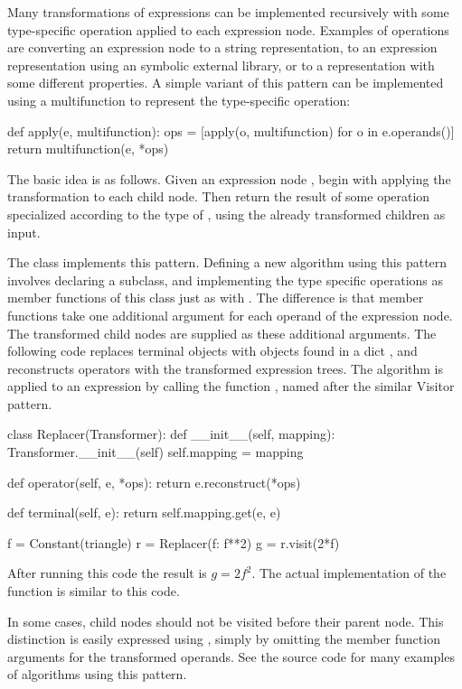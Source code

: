 Many transformations of expressions can be implemented recursively
with some type-specific operation applied to each expression node.
Examples of operations are converting an expression node to a string
representation, to an expression representation using an symbolic
external library, or to a \ufl{} representation with some different
properties.  A simple variant of this pattern can be implemented using
a multifunction to represent the type-specific operation:
\begin{python}
def apply(e, multifunction):
    ops = [apply(o, multifunction) for o in e.operands()]
    return multifunction(e, *ops)
\end{python}
The basic idea is as follows. Given an expression node ,
begin with applying the transformation to each child node.  Then
return the result of some operation specialized according to the type
of , using the already transformed children as input.

The  class implements this pattern.  Defining a new
algorithm using this pattern involves declaring a 
subclass, and implementing the type specific operations as member
functions of this class just as with .  The
difference is that member functions take one additional argument for
each operand of the expression node. The transformed child nodes are
supplied as these additional arguments.  The following code replaces
terminal objects with objects found in a dict , and
reconstructs operators with the transformed expression trees. The
algorithm is applied to an expression by calling the function
, named after the similar Visitor pattern.
\begin{python}
class Replacer(Transformer):
    def __init__(self, mapping):
        Transformer.__init__(self)
        self.mapping = mapping

    def operator(self, e, *ops):
        return e.reconstruct(*ops)

    def terminal(self, e):
        return self.mapping.get(e, e)

f = Constant(triangle)
r = Replacer({f: f**2})
g = r.visit(2*f)
\end{python}
After running this code the result is $g = 2 f^2$.  The actual
implementation of the  function is similar to this
code.

In some cases, child nodes should not be visited before their parent
node. This distinction is easily expressed using ,
simply by omitting the member function arguments for the transformed
operands. See the source code for many examples of algorithms using
this pattern.

